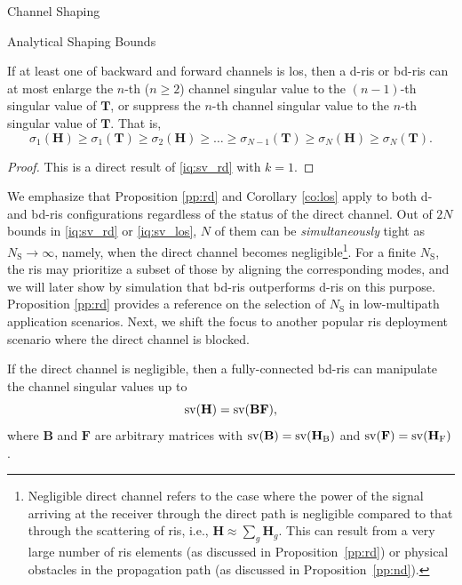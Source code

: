 \documentclass[journal]{IEEEtran}
\begin{document}
\begin{section}{Channel Shaping}
\begin{subsection}{Analytical Shaping Bounds}
		\begin{corollary}
			\label{co:los}
			If at least one of backward and forward channels is \gls{los}, then a \gls{d}-\gls{ris} or \gls{bd}-\gls{ris} can at most enlarge the $n$-th ($n \ge 2$) channel singular value to the $(n-1)$-th singular value of $\mathbf{T}$, or suppress the $n$-th channel singular value to the $n$-th singular value of $\mathbf{T}$.
			That is,
			\begin{equation}
				\label{iq:sv_los}
				\sigma_1(\mathbf{H}) \ge \sigma_1(\mathbf{T}) \ge {\sigma_2(\mathbf{H})} \ge \ldots \ge \sigma_{N-1}(\mathbf{T}) \ge {\sigma_N(\mathbf{H})} \ge \sigma_N(\mathbf{T}).
			\end{equation}
		\end{corollary}

		\begin{proof}
			This is a direct result of \eqref{iq:sv_rd} with $k = 1$.
		\end{proof}

		We emphasize that Proposition \ref{pp:rd} and Corollary \ref{co:los} apply to both \gls{d}- and \gls{bd}-\gls{ris} configurations regardless of the status of the direct channel.
		Out of $2N$ bounds in \eqref{iq:sv_rd} or \eqref{iq:sv_los}, $N$ of them can be \emph{simultaneously} tight as $N_\mathrm{S} \to \infty$, namely, when the direct channel becomes negligible\footnote{Negligible direct channel refers to the case where the power of the signal arriving at the receiver through the direct path is negligible compared to that through the scattering of \gls{ris}, i.e., $\mathbf{H} \approx \sum_g \mathbf{H}_g$. This can result from a very large number of \gls{ris} elements (as discussed in Proposition~\ref{pp:rd}) or physical obstacles in the propagation path (as discussed in Proposition~\ref{pp:nd}).}.
		For a finite $N_\mathrm{S}$, the \gls{ris} may prioritize a subset of those by aligning the corresponding modes, and we will later show by simulation that \gls{bd}-\gls{ris} outperforms \gls{d}-\gls{ris} on this purpose.
		Proposition \ref{pp:rd} provides a reference on the selection of $N_\mathrm{S}$ in low-multipath application scenarios.
		Next, we shift the focus to another popular \gls{ris} deployment scenario where the direct channel is blocked.


		\begin{proposition}
			\label{pp:nd}
			If the direct channel is negligible, then a fully-connected \gls{bd}-\gls{ris} can manipulate the channel singular values up to
			\begin{equation}
				\operatorname{sv}(\mathbf{H}) = \operatorname{sv}(\mathbf{BF}),
			\end{equation}
			where $\mathbf{B}$ and $\mathbf{F}$ are arbitrary matrices with $\operatorname{sv}(\mathbf{B})=\operatorname{sv}(\mathbf{H}_\mathrm{B})$ and $\operatorname{sv}(\mathbf{F})=\operatorname{sv}(\mathbf{H}_\mathrm{F})$.
		\end{proposition}


\end{subsection}
\end{section}
\end{document}
